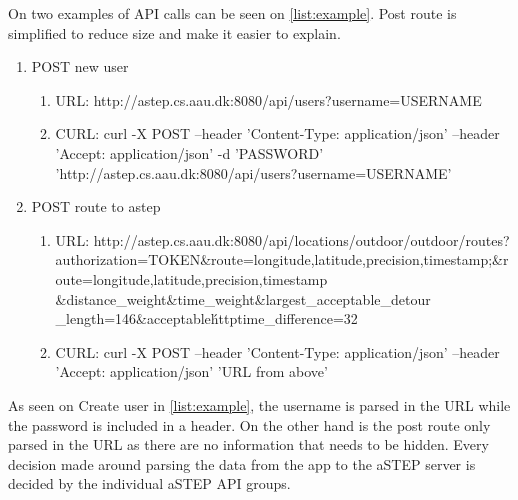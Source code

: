 On two examples of API calls can be seen on \ref{list:example}.
Post route is simplified to reduce size and make it easier to explain.

\begin{enumerate}
\label{list:example}
\item POST new user
\begin{enumerate}
\item URL: http://astep.cs.aau.dk:8080/api/users?username=USERNAME
\item CURL: curl -X POST --header 'Content-Type: application/json' --header 'Accept: application/json' -d 'PASSWORD' 'http://astep.cs.aau.dk:8080/api/users?username=USERNAME'
\end{enumerate}
\item POST route to \gls{astep}
\begin{enumerate}
\item URL: http://astep.cs.aau.dk:8080/api/locations/outdoor/outdoor/routes?authorization=TOKEN\&route=longitude,latitude,precision,timestamp;\&route=longitude,latitude,precision,timestamp
\&distance\_weight\&time\_weight\&largest\_acceptable\_detour\\
\_length=146\&acceptable\'httptime\_difference=32
\item CURL: curl -X POST --header 'Content-Type: application/json' --header 'Accept: application/json' 'URL from above'
\end{enumerate}
\end{enumerate}

As seen on Create user in \ref{list:example}, the username is parsed in the URL while the password is included in a header.
On the other hand is the post route only parsed in the URL as there are no information that needs to be hidden.
Every decision made around parsing the data from the app to the aSTEP server is decided by the individual aSTEP API groups.



